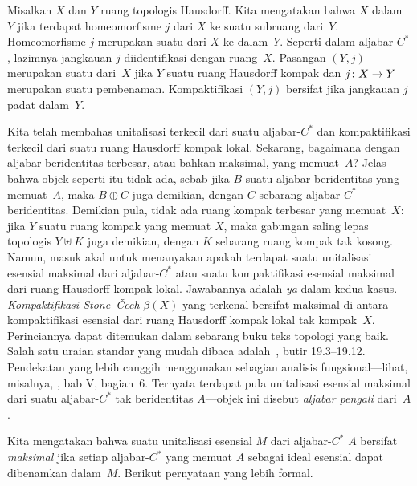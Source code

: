 \begin{defn} Misalkan $X$ dan $Y$ ruang topologis Hausdorff. Kita mengatakan bahwa $X$
 dalam~$Y$ jika terdapat homeomorfisme $j$ dari $X$ ke suatu subruang dari~$Y$.
Homeomorfisme $j$ merupakan suatu
 dari $X$ ke dalam~$Y$. Seperti dalam aljabar-$C^*$, lazimnya
jangkauan $j$ diidentifikasi dengan ruang~$X$. Pasangan $(Y,j)$ merupakan suatu
 dari~$X$ jika $Y$ suatu ruang Hausdorff kompak dan $j\colon X \rightarrow Y$
merupakan suatu pembenaman. Kompaktifikasi $(Y,j)$ bersifat
 jika jangkauan $j$ padat dalam~$Y$.
\end{defn}

Kita telah membahas unitalisasi terkecil dari suatu aljabar-$C^*$ dan kompaktifikasi terkecil
dari suatu ruang Hausdorff kompak lokal. Sekarang, bagaimana dengan aljabar beridentitas terbesar, atau bahkan
maksimal, yang memuat~$A$? Jelas bahwa objek seperti itu tidak ada, sebab jika $B$ suatu
aljabar beridentitas yang memuat~$A$, maka $B \oplus C$ juga demikian, dengan $C$ sebarang
aljabar-$C^*$ beridentitas. Demikian pula, tidak ada ruang kompak terbesar yang memuat~$X$: jika $Y$ suatu
ruang kompak yang memuat $X$, maka gabungan saling lepas topologis $Y \uplus K$ juga demikian,
dengan $K$ sebarang ruang kompak tak kosong. Namun, masuk akal untuk menanyakan apakah
terdapat suatu unitalisasi esensial maksimal dari aljabar-$C^*$ atau suatu kompaktifikasi esensial
maksimal dari ruang Hausdorff kompak lokal. Jawabannya adalah \emph{ya} dalam kedua
kasus. \emph{Kompaktifikasi Stone--\v{C}ech} $\beta(X)$ yang terkenal bersifat maksimal di antara
kompaktifikasi esensial dari ruang Hausdorff kompak lokal tak kompak~$X$. Perinciannya
dapat ditemukan dalam sebarang buku teks topologi yang baik. Salah satu uraian standar yang mudah dibaca
adalah~\cite{Willard:1968}, butir 19.3--19.12. Pendekatan yang lebih canggih menggunakan sebagian
analisis fungsional---lihat, misalnya, \cite{Conway:1990}, bab V, bagian~6. Ternyata
terdapat pula unitalisasi esensial maksimal dari suatu aljabar-$C^*$ tak beridentitas
$A$---objek ini disebut \emph{aljabar pengali} dari~$A$.

Kita mengatakan bahwa suatu unitalisasi esensial $M$ dari aljabar-$C^*$ $A$ bersifat \emph{maksimal} jika setiap
aljabar-$C^*$ yang memuat $A$ sebagai ideal esensial dapat dibenamkan dalam~$M$. Berikut pernyataan yang lebih
formal.

